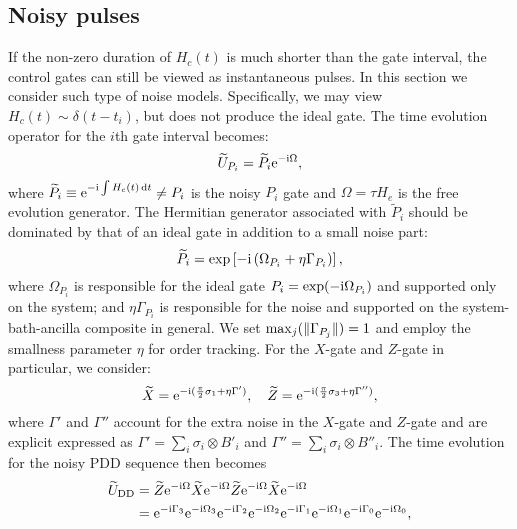 \documentclass[b5paper,11pt]{article}
\newcommand{\wt}[1]{\widetilde{#1}}
\newcommand{\rDD}{\mathrm{DD}}
\begin{document}
\subsection{Noisy pulses}
If the non-zero duration of $H_c(t)$ is much shorter than the gate interval,  the control gates can still be viewed as instantaneous pulses. In this section we consider such type of noise models. 
Specifically, we may view
$H_c(t)\sim \delta(t-t_i)$, but does not produce the ideal gate.
The time evolution operator for the $i$th gate interval becomes:
\begin{equation}\label{eq:npulses-Ui}
 \wt U_{P_i} = \wt P_i \upe^{-\upi \Omega},
\end{equation}
where $\widetilde{P}_i \equiv\mathrm{e}^{-\mathrm{i} \int H_c(t) \mathop{}\!\mathrm{d} t}\neq P_i$ is the noisy $P_i$ gate and $\Omega=\tau H_e$ is the free evolution generator.
The Hermitian generator associated with $\wt P_i$  should be dominated by that of an ideal gate in addition to a small noise part:
\begin{equation}\label{eq:npulses-Pi}
 \widetilde{P}_i= \exp\left[ -\mathrm{i} \left( \Omega_{P_i} +  \eta \Gamma_{P_i} \right)  \right],
\end{equation}
where $\Omega_{P_i}$ is responsible for the ideal gate $P_i = \exp(-\mathrm{i} \Omega_{P_i})$ and supported only on the system; and $ \eta \Gamma_{P_i} $ is responsible for the noise and supported on the system-bath-ancilla composite in general. We set $\max_j (\Vert {\Gamma_{P_j}} \Vert )=1$ and employ the smallness parameter $\eta$ for order tracking. For the $X$-gate and $Z$-gate in particular, we consider:
\begin{equation}
\widetilde{X} = \mathrm{e}^{-\mathrm{i} ( \frac{\pi}{2} \sigma_1 + \eta\Gamma')},\quad
 \widetilde{Z} = \mathrm{e}^{-\mathrm{i} ( \frac{\pi}{2} \sigma_3 + \eta\Gamma'')},
\end{equation}
where $\Gamma'$ and $\Gamma''$ account for the extra noise 
in the $X$-gate and $Z$-gate and are explicit expressed as
 $\Gamma' = \sum_i \sigma_i \otimes B'_i $ and $\Gamma''=\sum_i \sigma_i \otimes B''_i$. 
The time evolution for the noisy PDD sequence then becomes
 \begin{align}
 \notag
\wt U_\rDD &=
 \widetilde{Z} \upe^{-\upi \Omega}
 \widetilde{X} \upe^{-\upi \Omega}
 \widetilde{Z} \upe^{-\upi \Omega}
 \widetilde{X} \upe^{-\upi \Omega} \\
 \label{eq:UPDD-gatedep}
 & = \upe^{-\upi  \Gamma_3} \upe^{- \upi\Omega_3}
 \upe^{-\upi  \Gamma_2}  \upe^{-\upi\Omega_2}
\upe^{-\upi  \Gamma_1} \upe^{-\upi\Omega_1}
\upe^{-\upi  \Gamma_0}  \upe^{-\upi \Omega_0}, 
\end{align}
\end{document}
